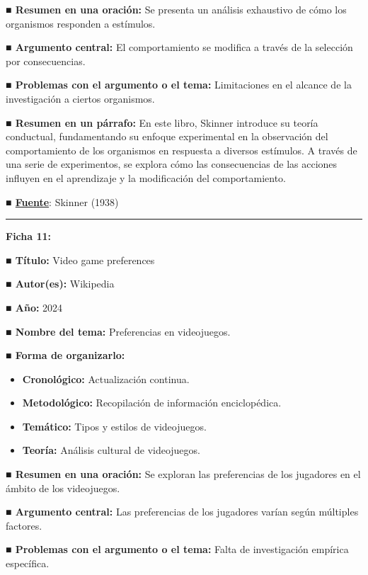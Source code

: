 \documentclass[
  letterpaper,
  DIV=11,
  numbers=noendperiod]{scrreprt}
\begin{document}
\textbf{■ Resumen en una oración:} Se presenta un análisis exhaustivo de
cómo los organismos responden a estímulos.

\textbf{■ Argumento central:} El comportamiento se modifica a través de
la selección por consecuencias.

\textbf{■ Problemas con el argumento o el tema:} Limitaciones en el
alcance de la investigación a ciertos organismos.

\textbf{■ Resumen en un párrafo:} En este libro, Skinner introduce su
teoría conductual, fundamentando su enfoque experimental en la
observación del comportamiento de los organismos en respuesta a diversos
estímulos. A través de una serie de experimentos, se explora cómo las
consecuencias de las acciones influyen en el aprendizaje y la
modificación del comportamiento.

\textbf{■
\href{https://books.google.com/books/about/The_Behavior_of_Organisms.html?id=S9WNCwAAQBAJ}{Fuente}}:
Skinner (1938)

\begin{center}\rule{0.5\linewidth}{0.5pt}\end{center}

\textbf{Ficha 11:}

\textbf{■ Título:} Video game preferences

\textbf{■ Autor(es):} Wikipedia

\textbf{■ Año:} 2024

\textbf{■ Nombre del tema:} Preferencias en videojuegos.

\textbf{■ Forma de organizarlo:}

\begin{itemize}
\item
  \textbf{Cronológico:} Actualización continua.
\item
  \textbf{Metodológico:} Recopilación de información enciclopédica.
\item
  \textbf{Temático:} Tipos y estilos de videojuegos.
\item
  \textbf{Teoría:} Análisis cultural de videojuegos.
\end{itemize}

\textbf{■ Resumen en una oración:} Se exploran las preferencias de los
jugadores en el ámbito de los videojuegos.

\textbf{■ Argumento central:} Las preferencias de los jugadores varían
según múltiples factores.

\textbf{■ Problemas con el argumento o el tema:} Falta de investigación
empírica específica.
\end{document}
